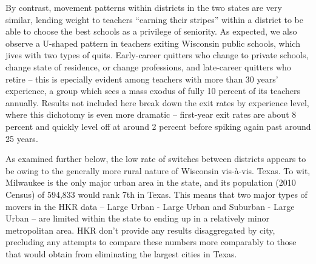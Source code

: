 \documentclass[12pt,]{article}
\begin{document}
By contrast, movement patterns within districts in the two states are
very similar, lending weight to teachers ``earning their stripes''
within a district to be able to choose the best schools as a privilege
of seniority. As expected, we also observe a U-shaped pattern in
teachers exiting Wisconsin public schools, which jives with two types of
quits. Early-career quitters who change to private schools, change state
of residence, or change professions, and late-career quitters who retire
-- this is epecially evident among teachers with more than 30 years'
experience, a group which sees a mass exodus of fully 10 percent of its
teachers annually. Results not included here break down the exit rates
by experience level, where this dichotomy is even more dramatic --
first-year exit rates are about 8 percent and quickly level off at
around 2 percent before spiking again past around 25 years.

As examined further below, the low rate of switches between districts
appears to be owing to the generally more rural nature of Wisconsin
vis-à-vis. Texas. To wit, Milwaukee is the only major urban area in the
state, and its population (2010 Census) of 594,833 would rank 7th in
Texas. This means that two major types of movers in the HKR data --
Large Urban - Large Urban and Suburban - Large Urban -- are limited
within the state to ending up in a relatively minor metropolitan area.
HKR don't provide any results disaggregated by city, precluding any
attempts to compare these numbers more comparably to those that would
obtain from eliminating the largest cities in Texas.
\end{document}
